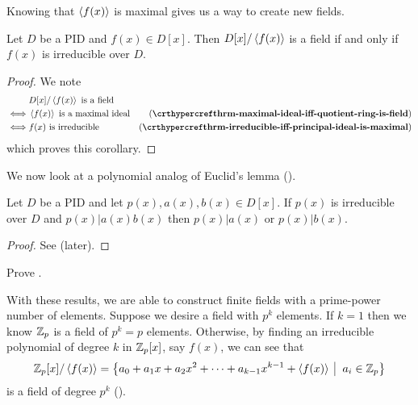 Knowing that $\left\langle f(x)\right\rangle$ is maximal gives us a way to create new fields.

\begin{corollary}\label{corollary-polynomial-quotient-by-principal-ideal-is-field-iff-polynomial-irreducible}
    Let $D$ be a PID and $f(x) \in D[x]$. Then $D[x]/\left\langle f(x)\right\rangle$ is a field if and only if $f(x)$ is irreducible over $D$.
\end{corollary}
\begin{proof}
    We note
    \begin{align*}
        &D[x]/\princ{f(x)} \text{ is a field}\\
        \iff&\princ{f(x)} \text{ is a maximal ideal} & (\myref{thrm-maximal-ideal-iff-quotient-ring-is-field})\\
        \iff&f(x) \text{ is irreducible} & (\myref{thrm-irreducible-iff-principal-ideal-is-maximal})
    \end{align*}
    which proves this corollary.
\end{proof}

We now look at a polynomial analog of Euclid's lemma ().

\begin{corollary}\label{corollary-irreducible-polynomial-division-rule}
    Let $D$ be a PID and let $p(x), a(x), b(x) \in D[x]$. If $p(x)$ is irreducible over $D$ and $p(x) \vert a(x)b(x)$ then $p(x) \vert a(x)$ or $p(x) \vert b(x)$.
\end{corollary}
\begin{proof}
    See  (later).
\end{proof}

\begin{exercise}\label{exercise-irreducible-polynomial-division-rule}
    Prove .
\end{exercise}

With these results, we are able to construct finite fields with a prime-power number of elements. Suppose we desire a field with $p^k$ elements. If $k = 1$ then we know $\mathbb{Z}_p$ is a field of $p^k = p$ elements. Otherwise, by finding an irreducible polynomial of degree $k$ in $\mathbb{Z}_p[x]$, say $f(x)$, we can see that
\[
    \Z_p[x]/\princ{f(x)} = \left\{a_0 + a_1x + a_2x^2 + \cdots + a_{k-1}x^{k-1} + \princ{f(x)} \vert a_i \in \Z_p\right\}
\]
is a field of degree $p^k$ ().

